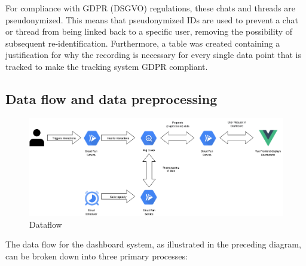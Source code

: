 \documentclass[
	english,
	ruledheaders=section,%
	class=report,%
	thesis={type=bachelor},%
	accentcolor=1b,%
	custommargins=true,%
	marginpar=false,%
	parskip=half-,%
	fontsize=11pt,%
	DIV=14,
]{tudapub}
\begin{document}
For compliance with GDPR (DSGVO) \parencite{DSGVO_2024} regulations, these chats and threads are pseudonymized. This means that pseudonymized IDs are used to prevent a chat or thread from being linked back to a specific user, removing the possibility of subsequent re-identification. Furthermore, a table was created containing a justification for why the recording is necessary for every single data point that is tracked to make the tracking system GDPR compliant.
\subsection{Data flow and data preprocessing}
\begin{figure}
    \centering
    \includegraphics[width=1\linewidth]{images/DataFlow_Bachelorthesis.drawio.png}
    \caption{Dataflow}
    \label{fig:enter-label}
\end{figure}
The data flow for the dashboard system, as illustrated in the preceding diagram, can be broken down into three primary processes:
\end{document}
